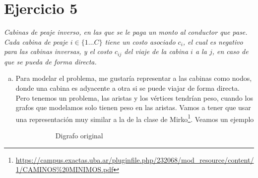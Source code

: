 \documentclass[12pt, a4paper]{report}
\theoremstyle{definition} %
\begin{document}
\newpage
\section*{Ejercicio 5}

\textit{Cabinas de peaje inverso, en las que se le paga un monto al conductor que pase. Cada cabina de peaje $i \in \{1 \dotso C \}$ tiene un costo asociado $c_i$, el cual es negativo para las cabinas inversas, y el costo $c_{ij}$ del viaje de la cabina $i$ a la $j$, en caso de que se pueda de forma directa.}

\begin{enumerate}[a)]
\item Para modelar el problema, me gustaría representar a las cabinas como nodos, donde una cabina es adyacente a otra si se puede viajar de forma directa. Pero tenemos un problema, las aristas y los vértices tendrían peso, cuando los grafos que modelamos solo tienen peso en las aristas. Vamos a tener que usar una representación muy similar a la de la clase de Mirko\footnote{\url{https://campus.exactas.uba.ar/pluginfile.php/232068/mod\_resource/content/1/CAMINOS\%20MINIMOS.pdf}}.
Veamos un ejemplo

\begin{figure}[H]
    \centering
    \begin{subfigure}[b]{0.4\textwidth}
        \centering
        \caption{Digrafo original}
    \end{subfigure}
    \begin{subfigure}[b]{0.4\textwidth}
        \centering
\end{subfigure}
\end{figure}
\end{enumerate}
\end{document}
